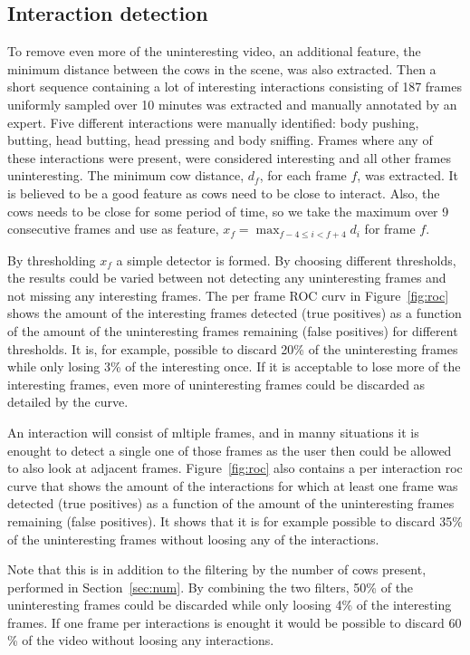 \documentclass{cta-author}
\begin{document}
\subsection{Interaction detection}
To remove even more of the uninteresting video, an additional feature, the minimum distance between the cows 
in the scene, was also extracted. Then a short sequence containing a lot of interesting interactions 
consisting of 187 frames uniformly sampled over 10 minutes was extracted and manually annotated by an expert. 
Five different interactions were manually identified: body pushing, butting, head butting, head pressing and 
body sniffing. Frames where any of these interactions were present, were considered interesting and all other 
frames uninteresting. The minimum cow distance, $d_f$, for each frame $f$, was extracted. It is believed to 
be a good feature as cows need to be close to interact. Also, the cows needs to be close for some period of 
time, so we take the maximum over 9 consecutive frames and use as feature, 
$x_f = \max_{f-4 \leq i < f+4} d_i$ for frame $f$.

By thresholding $x_f$ a simple detector is formed. By choosing different thresholds, the results could be 
varied between not detecting any uninteresting frames and not missing any interesting frames. The per frame 
ROC curv in Figure~\ref{fig:roc} shows the amount of the interesting frames detected (true positives) as a 
function of the amount of the uninteresting frames remaining (false positives) for different thresholds. It 
is, for example, possible to discard 20\% of the uninteresting frames while only losing 3\% of the 
interesting once. If it is acceptable to lose more of the interesting frames, even more of uninteresting 
frames could be discarded as detailed by the curve.

An interaction will consist of mltiple frames, and in manny situations it is enought to detect a single one 
of those frames as the user then could be allowed to also look at adjacent frames. Figure~\ref{fig:roc} also 
contains a per interaction roc curve that shows the amount of the interactions for which at least one frame 
was detected (true positives) as a function of the amount of the uninteresting frames remaining (false 
positives). It shows that it is for example possible to discard 35\% of the uninteresting frames without 
loosing any of the interactions.

Note that this is in addition to the filtering by the number of cows present, performed in 
Section~\ref{sec:num}. By combining the two filters, 50\% of the uninteresting frames could be discarded 
while only loosing 4\% of the interesting frames. If one frame per interactions is enought it would be 
possible to discard 60 \% of the video without loosing any interactions.
\end{document}
